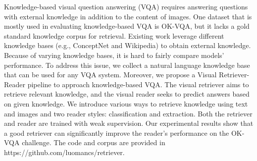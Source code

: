 Knowledge-based visual question answering (VQA) requires answering questions with external knowledge in addition to the content of images. One dataset that is mostly used in evaluating  knowledge-based VQA is OK-VQA, but it lacks a gold standard knowledge corpus for retrieval. Existing work leverage different knowledge bases (e.g., ConceptNet and Wikipedia) to obtain external knowledge. Because of varying knowledge bases, it is hard to fairly compare models' performance. To address this issue, we collect a natural language knowledge base that can be used for any VQA system. Moreover,  we propose a Visual Retriever-Reader pipeline to approach knowledge-based VQA. The visual retriever aims to retrieve relevant knowledge, and the visual reader seeks to predict answers based on given knowledge.  We introduce various ways to retrieve knowledge using text and images and two reader styles: classification and extraction. Both the retriever and reader are trained with weak supervision. Our experimental results show that a good retriever can significantly improve the reader's performance on the OK-VQA challenge. The code and corpus are provided in https://github.com/luomancs/retriever.
